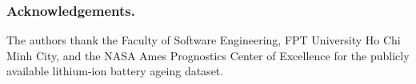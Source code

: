 %
\subsubsection*{Acknowledgements.}
The authors thank the Faculty of Software Engineering, FPT University Ho Chi
Minh City, and the NASA Ames Prognostics Center of Excellence for the publicly
available lithium-ion battery ageing dataset.

